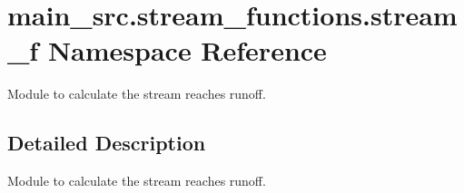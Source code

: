 \hypertarget{namespacemain__src_1_1stream__functions_1_1stream__f}{\section{main\-\_\-src.\-stream\-\_\-functions.\-stream\-\_\-f Namespace Reference}
\label{namespacemain__src_1_1stream__functions_1_1stream__f}
}


Module to calculate the stream reaches runoff.  




\subsection{Detailed Description}
Module to calculate the stream reaches runoff. 